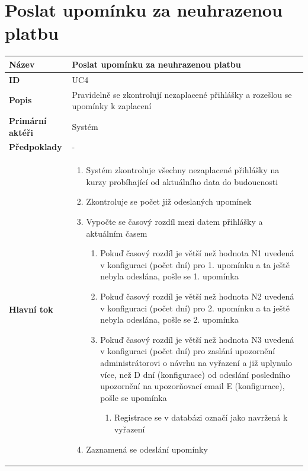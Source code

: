 \documentclass[12pt,a4paper,titlepage,final]{report}
\begin{document}
\section{Poslat upomínku za neuhrazenou platbu}
\begin{table}[h!]
	\begin{center}
    \begin{tabular}{ | p{4.2cm} | p{12.2cm} | }
    \hline
    \textbf{Název} & Poslat upomínku za neuhrazenou platbu
    \\ \hline
    
	\textbf{ID} & UC4
	\\ \hline
	
	\textbf{Popis} & Pravidelně se zkontrolují nezaplacené přihlášky a rozešlou se upomínky k zaplacení
	\\ \hline
	    
	\textbf{Primární aktéři} & Systém
	\\ \hline
	
	\textbf{Předpoklady} & -
    \\ \hline                
    
    \textbf{Hlavní tok} &
    \vspace{-3.5mm}    
    \begin{enumerate}
    	\itemsep0em 
    	\item Systém zkontroluje všechny nezaplacené přihlášky na kurzy probíhající od aktuálního data do budoucnosti
    	\item Zkontroluje se počet již odeslaných upomínek
	    \item Vypočte se časový rozdíl mezi datem přihlášky a aktuálním časem
	    \begin{enumerate}
	    	\item Pokuď časový rozdíl je větší než hodnota N1 uvedená v konfiguraci (počet dní) pro 1. upomínku a ta ještě nebyla odeslána, pošle se 1. upomínka
	    	\item Pokuď časový rozdíl je větší než hodnota N2 uvedená v konfiguraci (počet dní) pro 2. upomínku a ta ještě nebyla odeslána, pošle se 2. upomínka
   		    \item Pokuď časový rozdíl je větší než hodnota N3 uvedená v konfiguraci (počet dní) pro zaslání upozornění administrátorovi o návrhu na vyřazení a již uplynulo více, než D dní (konfigurace) od odeslání posledního upozornění na upozorňovací email E (konfigurace), pošle se upomínka
   		    \begin{enumerate}
   		    	\item Registrace se v databázi označí jako navržená k vyřazení
   		    \end{enumerate}
	    \end{enumerate}
	    \item Zaznamená se odeslání upomínky	 
	\end{enumerate}     
    \\ \hline
    

\end{tabular}
\end{center}
\end{table}
\end{document}
